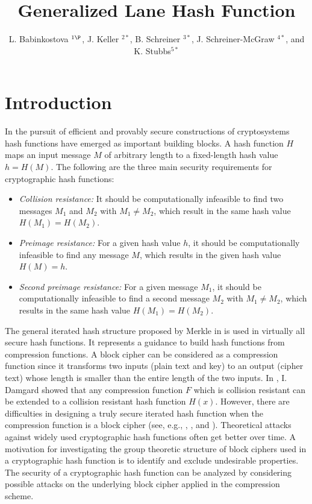 \documentclass[11pt]{amsart}
\title{Generalized Lane Hash Function} %
\author{L. Babinkostova $^{1\P}$, J. Keller $^{2*}$, B. Schreiner $^{3*}$, J. Schreiner-McGraw $^{4*}$, and K. Stubbs$^{5*}$ }
\begin{document}
\maketitle

\section{Introduction}
In the pursuit of efficient and provably  secure constructions of cryptosystems  hash functions have emerged as important building blocks.  A hash function $H$ maps an input message $M$ of arbitrary length to a fixed-length hash value $h = H(M)$.  The following are the three main security requirements for cryptographic hash functions:

\begin{itemize} 
\item {{\emph{Collision resistance:}} It should be computationally infeasible to find two messages $M_1$ and $M_2$ with $M_1\neq M_2$, which result in the same hash value $H(M_1) = H(M_2)$.}
\item {\emph {Preimage resistance:}} For a given hash value $h$, it should be computationally infeasible to find any message $M$, which results in the given hash value $H(M)=h$.
\item{\emph {Second preimage resistance:}} For a given message $M_1$, it should be computationally infeasible to find a second message $M_2$ with $M_1\neq M_2$, which results in the same hash value $H(M_1)=H(M_2)$. 
\end{itemize} 

The general iterated hash structure proposed by Merkle in \cite{Merkle} is used in virtually all secure hash functions. It represents a guidance to build hash functions from compression functions. A block cipher can be considered as a compression function since it transforms two inputs (plain text and key) to an output (cipher text) whose length is smaller than the entire length of the two inputs. In \cite{Damgard}, I. Damgard showed that any compression function $F$ which is collision resistant can be extended to a collision resistant hash function $H(x)$. However, there are difficulties in designing a truly secure iterated hash function when the compression function is a block cipher (see, e.g., \cite{Black}, \cite {Preneel}, \cite {Preneel1} and \cite {Preneel2}).  Theoretical attacks against widely used cryptographic hash functions often get better over time. A motivation for investigating the group theoretic structure of  block ciphers used in a cryptographic hash function is to identify and exclude undesirable properties.  The security of a cryptographic hash function can be analyzed by considering possible attacks on the underlying block cipher applied in the compression scheme. 
\end{document}
